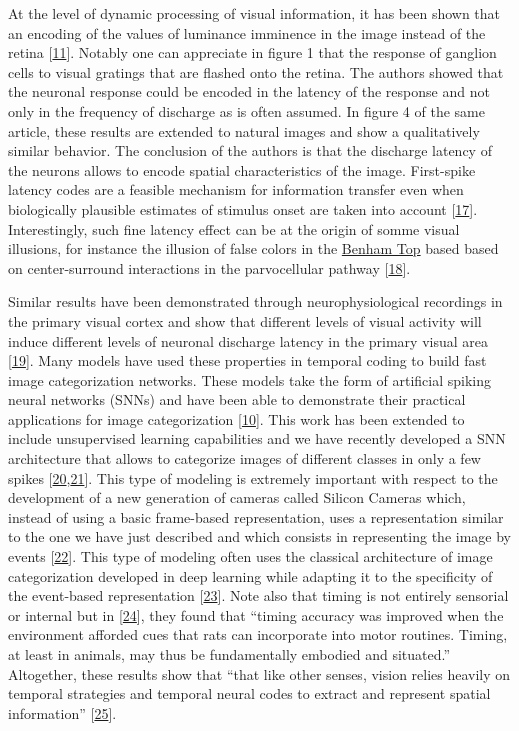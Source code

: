 At the level of dynamic processing of visual information, it has been shown that an encoding of the values of luminance imminence in the image instead of the retina {[}\protect\hyperlink{ref-IjepoonT}{11}{]}. Notably one can appreciate in figure 1 that the response of ganglion cells to visual gratings that are flashed onto the retina. The authors showed that the neuronal response could be encoded in the latency of the response and not only in the frequency of discharge as is often assumed. In figure 4 of the same article, these results are extended to natural images and show a qualitatively similar behavior. The conclusion of the authors is that the discharge latency of the neurons allows to encode spatial characteristics of the image. First-spike latency codes are a feasible mechanism for information transfer even when biologically plausible estimates of stimulus onset are taken into account {[}\protect\hyperlink{ref-1H1Omh73g}{17}{]}. Interestingly, such fine latency effect can be at the origin of somme visual illusions, for instance the illusion of false colors in the \href{https://michaelbach.de/ot/col-Benham/index.html}{Benham Top} based based on center-surround interactions in the parvocellular pathway {[}\protect\hyperlink{ref-UlbjMU0W}{18}{]}.

Similar results have been demonstrated through neurophysiological recordings in the primary visual cortex and show that different levels of visual activity will induce different levels of neuronal discharge latency in the primary visual area {[}\protect\hyperlink{ref-513xqzmL}{19}{]}. Many models have used these properties in temporal coding to build fast image categorization networks. These models take the form of artificial spiking neural networks (SNNs) and have been able to demonstrate their practical applications for image categorization {[}\protect\hyperlink{ref-1DpSM1kpQ}{10}{]}. This work has been extended to include unsupervised learning capabilities and we have recently developed a SNN architecture that allows to categorize images of different classes in only a few spikes {[}\protect\hyperlink{ref-7K80jcx9}{20},\protect\hyperlink{ref-fRudGmR1}{21}{]}. This type of modeling is extremely important with respect to the development of a new generation of cameras called Silicon Cameras which, instead of using a basic frame-based representation, uses a representation similar to the one we have just described and which consists in representing the image by events {[}\protect\hyperlink{ref-Oet1bgdb}{22}{]}. This type of modeling often uses the classical architecture of image categorization developed in deep learning while adapting it to the specificity of the event-based representation {[}\protect\hyperlink{ref-15cR83gqd}{23}{]}. Note also that timing is not entirely sensorial or internal but in {[}\protect\hyperlink{ref-1E8gkynCm}{24}{]}, they found that ``timing accuracy was improved when the environment afforded cues that rats can incorporate into motor routines. Timing, at least in animals, may thus be fundamentally embodied and situated.'' Altogether, these results show that ``that like other senses, vision relies heavily on temporal strategies and temporal neural codes to extract and represent spatial information'' {[}\protect\hyperlink{ref-QK8RfvTZ}{25}{]}.

